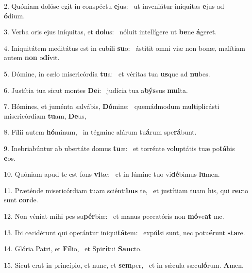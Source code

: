 2. Quóniam dolóse egit in conspéctu \textbf{e}jus: \ast\  ut inveniátur iníquitas \textbf{e}jus ad \textbf{ó}dium.\

3. Verba oris ejus iníquitas, et \textbf{do}lus: \ast\  nóluit intellígere ut \textbf{be}ne \textbf{á}geret.\

4. Iniquitátem meditátus est in cubíli \textbf{su}o: \ast\  ástitit omni viæ non bonæ, malítiam autem \textbf{non} o\textbf{dí}vit.\

5. Dómine, in cælo misericórdia \textbf{tu}a: \ast\  et véritas tua \textbf{us}que ad \textbf{nu}bes.\

6. Justítia tua sicut montes \textbf{De}i: \ast\  judícia tua a\textbf{býs}sus \textbf{mul}ta.\

7. Hómines, et juménta salvábis, \textbf{Dó}mine: \ast\  quemádmodum multiplicásti misericórdiam \textbf{tu}am, \textbf{De}us,\

8. Fílii autem \textbf{hó}minum, \ast\  in tégmine alárum tu\textbf{á}rum spe\textbf{rá}bunt.\

9. Inebriabúntur ab ubertáte domus \textbf{tu}æ: \ast\  et torrénte voluptátis tuæ po\textbf{tá}bis \textbf{e}os.\

10. Quóniam apud te est fons \textbf{vi}tæ: \ast\  et in lúmine tuo vi\textbf{dé}bimus \textbf{lu}men.\

11. Præténde misericórdiam tuam sciénti\textbf{bus} te, \ast\  et justítiam tuam his, qui \textbf{rec}to sunt \textbf{cor}de.\

12. Non véniat mihi pes su\textbf{pér}biæ: \ast\  et manus peccatóris non \textbf{mó}ve\textbf{at} me.\

13. Ibi cecidérunt qui operántur iniqui\textbf{tá}tem: \ast\  expúlsi sunt, nec potu\textbf{é}runt \textbf{sta}re.\

14. Glória Patri, et \textbf{Fí}lio, \ast\  et Spi\textbf{rí}tui \textbf{Sanc}to.\

15. Sicut erat in princípio, et nunc, et \textbf{sem}per, \ast\  et in sǽcula sæcu\textbf{ló}rum. \textbf{A}men.\

